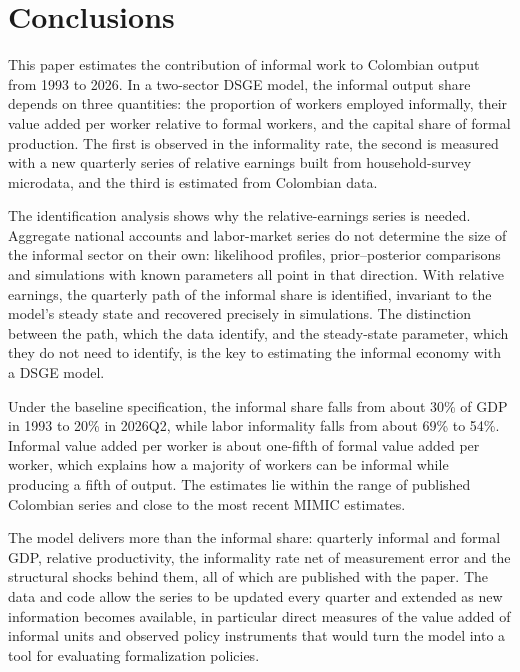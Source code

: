 \section{Conclusions}
\label{sec:conclusions}

This paper estimates the contribution of informal work to Colombian output from 1993 to 2026. In a two-sector DSGE model, the informal output share depends on three quantities: the proportion of workers employed informally, their value added per worker relative to formal workers, and the capital share of formal production. The first is observed in the informality rate, the second is measured with a new quarterly series of relative earnings built from household-survey microdata, and the third is estimated from Colombian data.

The identification analysis shows why the relative-earnings series is needed. Aggregate national accounts and labor-market series do not determine the size of the informal sector on their own: likelihood profiles, prior--posterior comparisons and simulations with known parameters all point in that direction. With relative earnings, the quarterly path of the informal share is identified, invariant to the model's steady state and recovered precisely in simulations. The distinction between the path, which the data identify, and the steady-state parameter, which they do not need to identify, is the key to estimating the informal economy with a DSGE model.

Under the baseline specification, the informal share falls from about 30\% of GDP in 1993 to 20\% in 2026Q2, while labor informality falls from about 69\% to 54\%. Informal value added per worker is about one-fifth of formal value added per worker, which explains how a majority of workers can be informal while producing a fifth of output. The estimates lie within the range of published Colombian series and close to the most recent MIMIC estimates.

The model delivers more than the informal share: quarterly informal and formal GDP, relative productivity, the informality rate net of measurement error and the structural shocks behind them, all of which are published with the paper. The data and code allow the series to be updated every quarter and extended as new information becomes available, in particular direct measures of the value added of informal units and observed policy instruments that would turn the model into a tool for evaluating formalization policies.
